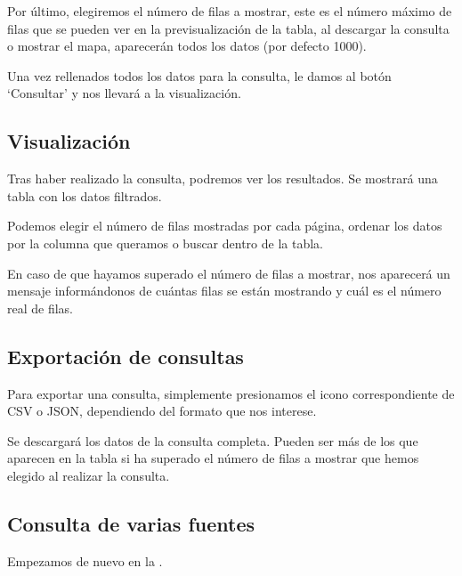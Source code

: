 Por último, elegiremos el número de filas a mostrar, este es el número máximo de filas que se pueden ver en la previsualización de la tabla, al descargar la consulta o mostrar el mapa, aparecerán todos los datos (por defecto 1000).


Una vez rellenados todos los datos para la consulta, le damos al botón `Consultar' y nos llevará a la visualización.

\subsection{Visualización} \label{visualizacion}

Tras haber realizado la consulta, podremos ver los resultados. Se mostrará una tabla con los datos filtrados.

Podemos elegir el número de filas mostradas por cada página, ordenar los datos por la columna que queramos o buscar dentro de la tabla. 


En caso de que hayamos superado el número de filas a mostrar, nos aparecerá un mensaje informándonos de cuántas filas se están mostrando y cuál es el número real de filas.


\subsection{Exportación de consultas} \label{exportar}

Para exportar una consulta, simplemente presionamos el icono correspondiente de CSV o JSON, dependiendo del formato que nos interese.

Se descargará los datos de la consulta completa. Pueden ser más de los que aparecen en la tabla si ha superado el número de filas a mostrar que hemos elegido al realizar la consulta.


\subsection{Consulta de varias fuentes}

Empezamos de nuevo en la .

